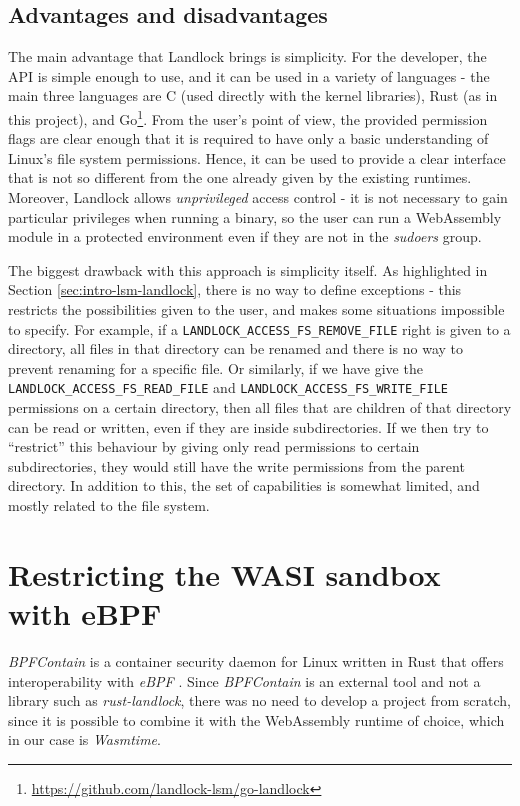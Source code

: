 \subsection{Advantages and disadvantages}

The main advantage that Landlock brings is simplicity. For the developer, the API is simple enough to use,
and it can be used in a variety of languages - the main three languages are C (used directly with the kernel libraries),
Rust (as in this project), and Go\footnote{\url{https://github.com/landlock-lsm/go-landlock}}.
From the user's point of view, the provided permission flags are clear enough that it is required to have
only a basic understanding of Linux's file system permissions.
Hence, it can be used to provide a clear interface that is not so different from the one already given by
the existing runtimes.
Moreover, Landlock allows \textit{unprivileged} access control - it is not necessary to gain particular privileges
when running a binary, so the user can run a WebAssembly module in a protected environment even if they are not
in the \textit{sudoers} group.

The biggest drawback with this approach is simplicity itself. As highlighted in Section \ref{sec:intro-lsm-landlock},
there is no way to define exceptions - this restricts the possibilities given to the user, and makes some situations
impossible to specify. For example, if a \texttt{LANDLOCK\_ACCESS\_FS\_REMOVE\_FILE} right is given to a directory,
all files in that directory can be renamed and there is no way to prevent renaming for a specific file.
Or similarly, if we have give the \texttt{LANDLOCK\_ACCESS\_FS\_READ\_FILE} and \texttt{LANDLOCK\_ACCESS\_FS\_WRITE\_FILE}
permissions on a certain directory, then all files that are children of that directory can be read or written, even
if they are inside subdirectories. If we then try to ``restrict'' this behaviour by giving only read permissions to
certain subdirectories, they would still have the write permissions from the parent directory.
In addition to this, the set of capabilities is somewhat limited, and mostly related to the file system.

\section{Restricting the WASI sandbox with eBPF}
\label{sec:restricting-wasi-ebpf}

\textit{BPFContain} \cite{bpfcontain} is a container security daemon for Linux written in Rust that offers
interoperability with \textit{eBPF} \cite{ebpf}.
Since \textit{BPFContain} is an external tool and not a library such as \textit{rust-landlock}, there was no need
to develop a project from scratch, since it is possible to combine it with the WebAssembly runtime of choice, which
in our case is \textit{Wasmtime}.

